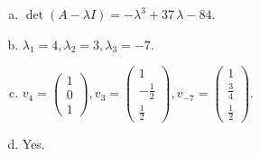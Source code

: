 \begin{questions}
\begin{solution}
\begin{enumerate}[(a)]
\item $\det(A-\lambda I)=-{\lambda}^{3} + 37 \, {\lambda} - 84$.
\item ${\lambda}_1=4, {\lambda}_2=3, {\lambda}_3=-7$.
\item $v_{4}=\left(\begin{array}{r}
1 \\
0 \\
1
\end{array}\right), v_{3}=\left(\begin{array}{r}
1 \\
-\frac{1}{2} \\
\frac{1}{2}
\end{array}\right), v_{-7}=\left(\begin{array}{r}
1 \\
\frac{3}{4} \\
\frac{1}{2}
\end{array}\right)$.
\item Yes.
\end{enumerate}
\end{solution}

\end{questions}

\newpage


\begin{center}
\end{center}

